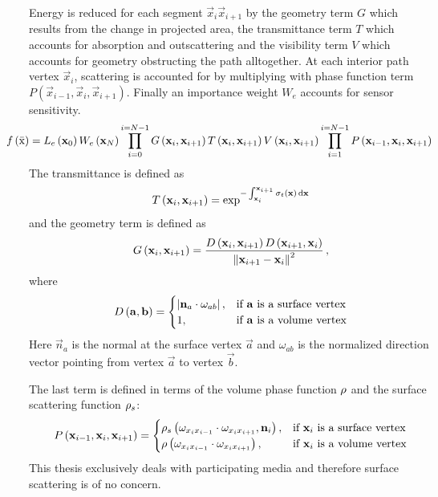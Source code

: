 Energy is reduced for each segment $\vec{x}_i \vec{x}_{i+1}$ by the geometry term $G$ which results from the change in projected area, the transmittance term $T$ which accounts for absorption and outscattering and the visibility term $V$ which accounts for geometry obstructing the path alltogether. At each interior path vertex $\vec{x}_i$, scattering is accounted for by multiplying with phase function term $P(\vec{x}_{i-1}, \vec{x}_i, \vec{x}_{i+1})$. Finally an importance weight $W_e$ accounts for sensor sensitivity.
\begin{align}
\hspace{-.3in}
f\left(\bar{\mathrm{x}}\right) =
L_e\left(\vec{x}_0\right)
W_e\left(\vec{x}_N\right)
\prod_{i=0}^{i=N-1}
G\left(\vec{x}_i, \vec{x}_{i+1}\right)
T\left(\vec{x}_i, \vec{x}_{i+1}\right)
V\left(\vec{x}_i, \vec{x}_{i+1}\right)
\prod_{i=1}^{i=N-1}
P\left(\vec{x}_{i-1}, \vec{x}_i, \vec{x}_{i+1}\right)
\label{eq:foundations_mc_pathintegral}
\end{align}
The transmittance is defined as
\begin{align}
T\left(\mathbf{x}_i, \mathbf{x}_{i+1}\right) =
\operatorname{exp}^
{
    -\int_{\mathbf{x}_i}^{\mathbf{x}_{i+1}}\sigma_t\left(\mathbf{x}\right)\,\mathrm{d}\mathbf{x}
}
\end{align}
and the geometry term is defined as
\begin{align}
G\left(\mathbf{x}_i, \mathbf{x}_{i+1}\right) =
\frac{D\left(\mathbf{x}_{i}, \mathbf{x}_{i+1}\right)D\left(\mathbf{x}_{i+1}, \mathbf{x}_{i}\right)}{\left\lVert\mathbf{x}_{i+1}-\mathbf{x}_{i}\right\rVert^2} \,,
\end{align}
where
\begin{align}
D\left(\mathbf{a}, \mathbf{b}\right) =
\begin{cases}
\left\vert\mathbf{n}_a\cdot\omega_{ab}\right\vert, & \text{if $\mathbf{a}$ is a surface vertex}
\\
1, & \text{if $\mathbf{a}$ is a volume vertex}
\end{cases}
\end{align}
Here $\vec{n}_a$ is the normal at the surface vertex $\vec{a}$ and $\omega_{ab}$ is the normalized direction vector pointing from vertex $\vec{a}$ to vertex $\vec{b}$.

The last term is defined in terms of the volume phase function $\rho$ and the surface scattering function $\rho_s$:
\begin{align}
P\left(\mathbf{x}_{i-1}, \mathbf{x}_i, \mathbf{x}_{i+1}\right) =
\begin{cases}
\rho_s\left(\omega_{x_ix_{i-1}}\cdot\omega_{x_ix_{i+1}}, \mathbf{n}_i\right), & \text{if $\mathbf{x}_i$ is a surface vertex}
\\
\rho\left(\omega_{x_ix_{i-1}}\cdot\omega_{x_ix_{i+1}}\right), & \text{if $\mathbf{x}_i$ is a volume vertex}
\end{cases}
\end{align}
This thesis exclusively deals with participating media and therefore surface scattering is of no concern.

